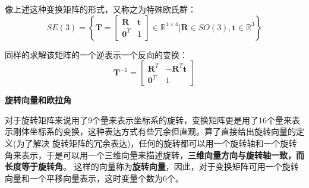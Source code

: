 \documentclass[10pt]{article}
\begin{document}
像上述这种变换矩阵的形式，又称之为特殊欧氏群：
$$SE(3)=\left\{\textbf{T}=\left[\begin{array}{cc}\textbf{R}&\textbf{t} \\ \textbf{0}^{T}&1\end{array}\right] \in \mathbb{R}^{4 \times 4}
|\textbf{R}\in SO(3),\textbf{t}\in \mathbb{R}^{3}\right\}$$

同样的求解该矩阵的一个逆表示一个反向的变换：
$$\textbf{T}^{-1}=\left[\begin{array}{cc}\textbf{R}^{T}&-\textbf{R}^{T}\textbf{t} \\ \textbf{0}^{T}&1 \end{array}\right]$$

\textbf{旋转向量和欧拉角}

对于旋转矩阵来说用了9个量来表示坐标系的旋转，变换矩阵更是用了16个量来表示刚体坐标系的变换，这种表达方式有些冗余但直观。算了直接给出旋转向量的定义(为了解决
旋转矩阵的冗余表达)，任何的旋转都可以用一个旋转轴和一个旋转角来表示，于是可以用一个三维向量来描述旋转，\textbf{三维向量方向与旋转轴一致，而长度等于旋转角}。
这样的向量称为\textbf{旋转向量}，因此，对于变换矩阵可用一个旋转向量和一个平移向量表示，这时变量个数为6个。
\end{document}
